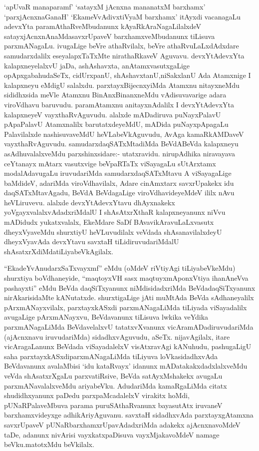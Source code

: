 \begin{artha}
`apUvaR manaparamf' `satayxM jAcnxna mananatxM barxhamx' `parxjAcnxnaGanaH' `EkameVvAdivxtiVyaM barxhamx' itAyxdi vacanagaLu adevxYta paramAthaRveMbudanunx kAyaRkAraNagaLilalxdeV satayxjAcnxnAnaMda\break savxrUpaveV barxhamxveMbudanunx tiLisuva parxmANagaLu. ivugaLige beVre athaRvilalx, beVre athaRvuLaLxdAdxdare samudarxdalilx eseyalapxTaTxMte nirathaRkaveV Aguvavu. devxYtAdevxYta kalapxneyelalxvU jaDa, ashAshavxta, anAtamxvasutxgaLige opApxgabahudaSeTx, cidUrxpanU, shAshavxtanU,\break niSakxlanU Ada Atamxnige I kalapxneyu eMdigU salalxdu. parxtayxBijecnxyiMda Atamxnu nitayxneMdu sididhxsida meVle Atamxnu BinAnxBinanxneMdu vAdisuvavarige adara viroVdhavu baruvudu. paramAtamxnu anitayxnAdalilx I devxYtAdevxYta kalapxneyeV vayxthaRvAguvudu. alalxde mADadiruva puNayxPalavU pApaPalavU Atamxnalilx barutatxdeyeMdU, mADida puNayxpApagaLu Palavilalxde nashisuvaveMdU heVLabeVkAguvudu, AvAga kamaRkAMDaveV vayxthaRvAguvudu. samudarxdaqSATxMtadiMda BeVdABeVda kalapxneyu asAdhuvalalxveMdu parxshinxsidare:- utatxravidu. nirupAdhika niravayava ceYtanayx mAtarx vasutxvige beVpaRTaTx viSayagaLu sUtArxtamx modalAdavugaLu iruvudariMda samudarxdaqSATxMtavu A viSayagaLige baMdideV, adariMda viroVdhavilalx, Adare cinAmxtarx savxrUpakekx idu daqSATxMtavAgadu, BeVdA BeVdagaLige viroVdhavideyeMdeV ililx nAvu heVLiruvevu. alalxde devxYtAdevxYtavu dhAyxnakekx yoVgayxvalalxvAdadxriMdalU I shAsAtxrXthaR kalapxneyanunx niVvu mADidudx yukatxvalalx, EkeMdare SaDf BAvavikAravuLaLxvasutx dheyxVyaveMdu shurxtiyU heVLuvudilalx veVdada shAsanavilalxdeyU dheyxVyavAda devxYtavu savxtaH tiLidiruvudariMdalU shAsatxrXdiMda\break tiLiyabeVkAgilalx.
\end{artha}

\begin{artha}
``EkadeYvAnudarxSaTxvayxmf'' eMdu (oMdeV riVtiyAgi tiLiyabeVkeMdu) shurxtiya boVdhaneyide, ``maqtoyxVH sasx maqtuyx\break mAponxVtiya ihanAneVva pashayxti'' eMdu BeVda daqSiTxyanunx niMdisidadxriMda BeVdadaqSiTxyanunx nirAkarisidaMte kANutatxde. shurxtigaLige jAti muMtAda BeVda sAdhaneyalilx pArxmANayxvilalx, parxtayxkASxdi parxmANagaLiMda tiLiyada viSayadalilx avugaLige pArxmANayxvu, BeVdavanunx tiLisuva lwkika veYdika parxmANagaLiMda BeVdavelalxvU tatatxvXvanunx vicAramADadiruvudariMda (ajAcnxnavu iruvudariMda) sidadhxvAguvudu, aSeTx. nijavAgilalx, itare vicAragaLanunx BeVdada viSayadalelxV visAtxravAgi kANuhudu, pashugaLigU saha parxtayxkASxdiparxmANagaLiMda tiLiyuva loVkasidadhxvAda BeVdavanunx avalaMbisi `idu kataRvayx' idanunx mADatakakxdadxlalxveMdu veVda shAsatxrXgaLu parxvatiRsive, BeVda satAyxMshakekx avugaLu parxmANavalalxveMdu ariyabeVku. AdudariMda kamaRgaLiMda citatx shudidhxyanunx paDedu parxpaMcadalelxV virakitx hoMdi, pUNaRPalaveMbuva parama puruSAthaRvanunx bayasutAtx iruvaneV barxhamxvideyxge adhikAriyAguvanu. savxtaH sidadhxvAda parxtayxgAtamxna savxrUpaveV pUNaRbarxhamxrUpavAdadxriMda adakekx ajAcnxnavoMdeV taDe, adanunx nivArisi vayxkatxpaDisuva vayxMjakavoMdeV namage beVku.\break matotxMdu beVkilalx.
\end{artha}

